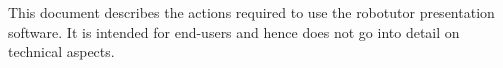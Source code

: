 This document describes the actions required to use the robotutor presentation software. It is intended for end-users and hence does not go into detail on technical aspects.

